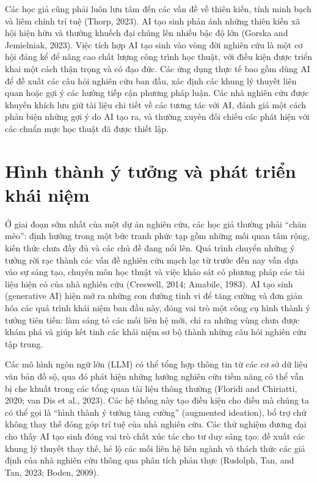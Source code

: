 Các học giả cũng phải luôn lưu tâm đến các vấn đề về thiên kiến, tính minh bạch và liêm chính trí tuệ (Thorp, 2023). AI tạo sinh phản ánh những thiên kiến xã hội hiện hữu và thường khuếch đại chúng lên nhiều bậc độ lớn (Gorska and Jemielniak, 2023). Việc tích hợp AI tạo sinh vào vòng đời nghiên cứu là một cơ hội đáng kể để nâng cao chất lượng công trình học thuật, với điều kiện được triển khai một cách thận trọng và có đạo đức. Các ứng dụng thực tế bao gồm dùng AI để đề xuất các câu hỏi nghiên cứu ban đầu, xác định các khung lý thuyết liên quan hoặc gợi ý các hướng tiếp cận phương pháp luận. Các nhà nghiên cứu được khuyến khích lưu giữ tài liệu chi tiết về các tương tác với AI, đánh giá một cách phản biện những gợi ý do AI tạo ra, và thường xuyên đối chiếu các phát hiện với các chuẩn mực học thuật đã được thiết lập.

\section{Hình thành ý tưởng và phát triển khái niệm}

Ở giai đoạn sớm nhất của một dự án nghiên cứu, các học giả thường phải ``chăn mèo'': định hướng trong một bức tranh phức tạp gồm những mối quan tâm rộng, kiến thức chưa đầy đủ và các chủ đề đang nổi lên. Quá trình chuyển những ý tưởng rời rạc thành các vấn đề nghiên cứu mạch lạc từ trước đến nay vẫn dựa vào sự sáng tạo, chuyên môn học thuật và việc khảo sát có phương pháp các tài liệu hiện có của nhà nghiên cứu (Creswell, 2014; Amabile, 1983). AI tạo sinh (generative AI) hiện mở ra những con đường tinh vi để tăng cường và đơn giản hóa các quá trình khái niệm ban đầu này, đóng vai trò một công cụ hình thành ý tưởng tiên tiến: làm sáng tỏ các mối liên hệ mới, chỉ ra những vùng chưa được khám phá và giúp kết tinh các khái niệm sơ bộ thành những câu hỏi nghiên cứu tập trung.

Các mô hình ngôn ngữ lớn (LLM) có thể tổng hợp thông tin từ các cơ sở dữ liệu văn bản đồ sộ, qua đó phát hiện những hướng nghiên cứu tiềm năng có thể vẫn bị che khuất trong các tổng quan tài liệu thông thường (Floridi and Chiriatti, 2020; van Dis et al., 2023). Các hệ thống này tạo điều kiện cho điều mà chúng ta có thể gọi là ``hình thành ý tưởng tăng cường'' (augmented ideation), bổ trợ chứ không thay thế đóng góp trí tuệ của nhà nghiên cứu. Các thử nghiệm đương đại cho thấy AI tạo sinh đóng vai trò chất xúc tác cho tư duy sáng tạo: đề xuất các khung lý thuyết thay thế, hé lộ các mối liên hệ liên ngành và thách thức các giả định của nhà nghiên cứu thông qua phân tích phản thực (Rudolph, Tan, and Tan, 2023; Boden, 2009).

